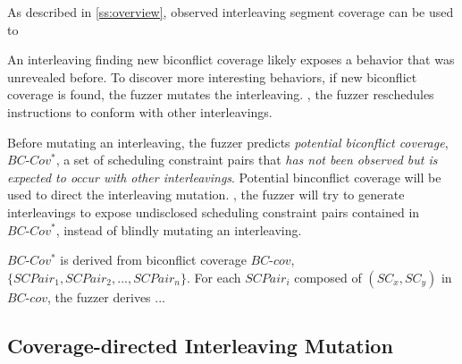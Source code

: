 


%
As described in \autoref{ss:overview}, observed interleaving segment
coverage can be used to

\dr{}

An interleaving finding new biconflict coverage likely exposes a
behavior that was unrevealed before.
%
To discover more interesting behaviors, if new biconflict coverage is
found, the fuzzer mutates the interleaving. \ie, the fuzzer
reschedules instructions to conform with other interleavings.

Before mutating an interleaving, the fuzzer predicts \textit{potential
  biconflict coverage}, $BC\mbox{-}Cov^*$, a set of scheduling
constraint pairs that \textit{has not been observed but is expected to
  occur with other interleavings}.
%
Potential binconflict coverage will be used to direct the interleaving
mutation. \ie, the fuzzer will try to generate interleavings to expose
undisclosed scheduling constraint pairs contained in
$BC\mbox{-}Cov^*$, instead of blindly mutating an interleaving.


$BC\mbox{-}Cov^*$ is derived from biconflict coverage $BC\mbox{-}cov$,
$\{SCPair_1, SCPair_2, ..., SCPair_n\}$.
%
For each $SCPair_i$ composed of $(SC_x, SC_y)$ in $BC\mbox{-}cov$, the
fuzzer derives ...



\subsection{Coverage-directed Interleaving Mutation}
\label{ss:scheduler}

